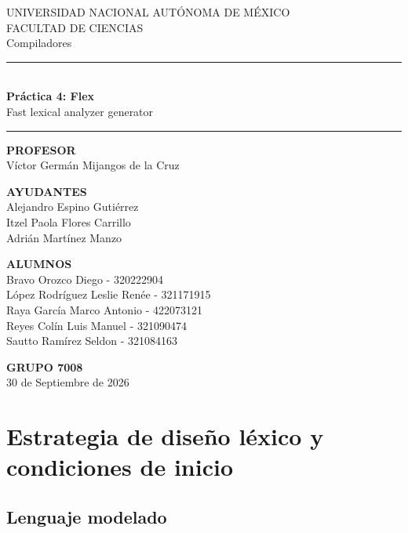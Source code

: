 \documentclass[11pt,letterpaper]{article}
\begin{document}
\begin{titlepage}
  \centering
  \vspace*{2cm}
  {\large UNIVERSIDAD NACIONAL AUTÓNOMA DE MÉXICO}\\[0.4em]
  {\large FACULTAD DE CIENCIAS}\\[0.4em]
  {\large Compiladores}

  \vspace{0.8cm}
  \rule{\textwidth}{0.4pt}\\[0.4em]
  {\Large\bfseries Práctica 4: Flex}\\[0.2em]
  {\normalsize Fast lexical analyzer generator}\\[0.1em]
  \rule{\textwidth}{0.4pt}

  \vspace{0.8cm}
  {\small\bfseries PROFESOR}\\[0.4em]
  Víctor Germán Mijangos de la Cruz

  \vspace{0.6cm}
  {\small\bfseries AYUDANTES}\\[0.4em]
  Alejandro Espino Gutiérrez\\
  Itzel Paola Flores Carrillo\\
  Adrián Martínez Manzo

  \vspace{0.6cm}
  {\small\bfseries ALUMNOS}\\[0.4em]
  Bravo Orozco Diego - 320222904\\
  López Rodríguez Leslie Renée - 321171915\\
  Raya García Marco Antonio - 422073121\\
  Reyes Colín Luis Manuel - 321090474\\
  Sautto Ramírez Seldon - 321084163

  \vspace{0.8cm}
  {\small\bfseries GRUPO 7008}\\[0.2em]
  {\small 30 de Septiembre de 2026}
\end{titlepage}

\tableofcontents
\newpage

\section{Estrategia de diseño léxico y condiciones de inicio}

\subsection{Lenguaje modelado}
\end{document}
